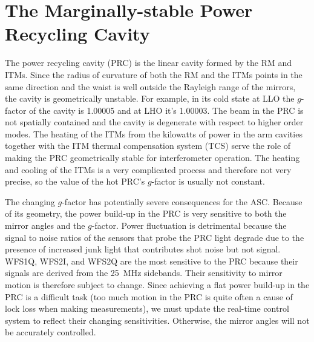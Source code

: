 \section{The Marginally-stable Power Recycling Cavity}
The power recycling cavity (PRC) is the linear cavity formed by the RM
and ITMs. Since the radius of curvature of both the RM and the ITMs
points in the same direction and the waist is well outside the
Rayleigh range of the mirrors, the cavity is geometrically
unstable. For example, in its cold state at LLO the $g$-factor of the
cavity is 1.00005 and at LHO it's 1.00003. The beam in the PRC is not
spatially contained and the cavity is degenerate with respect to
higher order modes. The heating of the ITMs from the kilowatts of
power in the arm cavities together with the ITM thermal compensation
system (TCS) serve the role of making the PRC geometrically stable for
interferometer operation. The heating and cooling of the ITMs is a
very complicated process and therefore not very precise, so the value
of the hot PRC's $g$-factor is usually not constant.

The changing $g$-factor has potentially severe consequences
for the ASC. Because of its geometry, the power build-up in the PRC is
very sensitive to both the mirror angles and the $g$-factor. Power
fluctuation is detrimental because the signal to noise ratios of the
sensors that probe the PRC light degrade due to the presence of
increased junk light that contributes shot noise but not
signal. WFS1Q, WFS2I, and WFS2Q are the most sensitive to the PRC
because their signals are derived from the 25~MHz sidebands. Their
sensitivity to mirror motion is therefore subject to change. Since
achieving a flat power build-up in the PRC is a difficult task (too
much motion in the PRC is quite often a cause of lock loss when making
measurements), we must update the real-time control system to reflect
their changing sensitivities. Otherwise, the mirror angles will not be
accurately controlled.

